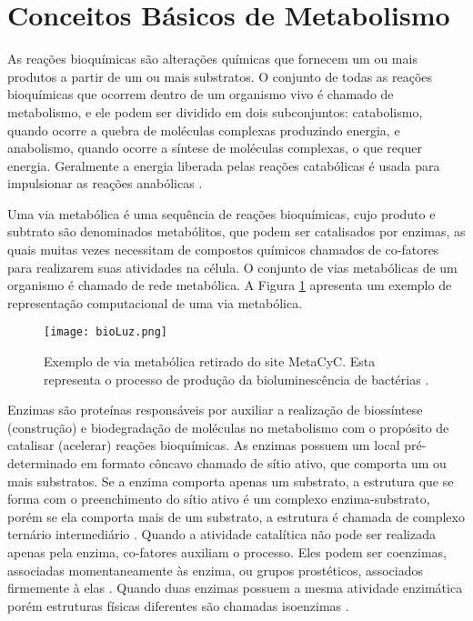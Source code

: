 

\section{Conceitos Básicos de Metabolismo} \label{conceitosMeta}


\indent As reações bioquímicas são alterações químicas que fornecem um ou mais produtos a partir de um ou mais substratos. O conjunto de todas as reações bioquímicas que ocorrem dentro de um organismo vivo é chamado de metabolismo, e ele podem ser dividido em dois subconjuntos: catabolismo, quando ocorre a quebra de moléculas complexas produzindo energia, e anabolismo, quando ocorre a síntese de moléculas complexas, o que requer energia. Geralmente a energia liberada pelas reações catabólicas é usada para impulsionar as reações anabólicas \cite{carterClass}.

\indent Uma via metabólica é uma sequência de reações bioquímicas, cujo produto e subtrato são denominados metabólitos, que podem ser catalisados por enzimas, as quais muitas vezes necessitam de compostos químicos chamados de co-fatores para realizarem suas atividades na célula. O conjunto de vias metabólicas de um organismo é chamado de rede metabólica. A Figura \ref{fig:bioLuz} apresenta um exemplo de representação computacional de uma via metabólica.

\begin{figure}[h]
    \centering
    \texttt{[image: bioLuz.png]}
    \caption{Exemplo de via metabólica retirado do site MetaCyC. Esta representa o processo de produção da bioluminescência de bactérias \cite{examplePathway}. }
    \label{fig:bioLuz}
\end{figure} 

\indent Enzimas são proteínas responsáveis por auxiliar a realização de biossíntese (construção) e biodegradação de moléculas no metabolismo com o propósito de catalisar (acelerar) reações bioquímicas. As enzimas possuem um local pré-determinado em formato côncavo chamado de sítio ativo, que comporta um ou mais substratos. Se a enzima comporta apenas um substrato, a estrutura que se forma com o preenchimento do sítio ativo é um complexo enzima-substrato, porém se ela comporta mais de um substrato, a estrutura é chamada de complexo ternário intermediário \cite{Cap2schomburg}. Quando a atividade catalítica não pode ser realizada apenas pela enzima, co-fatores auxiliam o processo. Eles podem ser coenzimas, associadas momentaneamente às enzima, ou grupos prostéticos, associados firmemente à elas \cite{Cap2schomburg}. Quando duas enzimas possuem a mesma atividade enzimática porém estruturas físicas diferentes são chamadas isoenzimas \cite{Cap2schomburg}.


